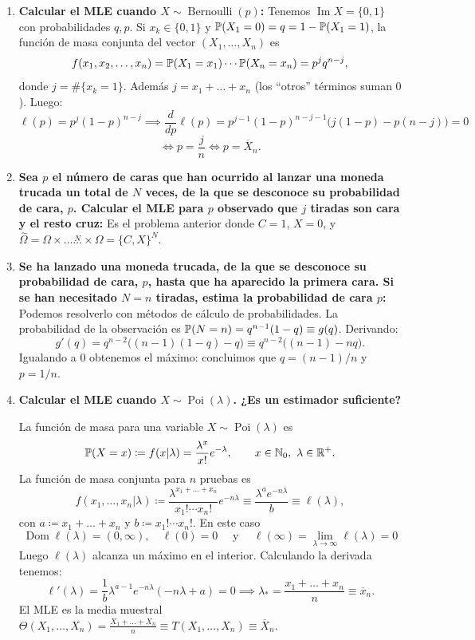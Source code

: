 \begin{enumerate}
  \item \textbf{Calcular el MLE cuando $X \sim \operatorname{Bernoulli}(p)$:}
  Tenemos $\operatorname{Im} X = \{0, 1\}$ con probabilidades $q, p$. Si $x_k \in \{0, 1\}$ y $\mathbb{P}(X_1 = 0) = q = 1 - \mathbb{P}(X_1 = 1)$, la función de masa conjunta del vector $(X_1, \dots, X_n)$ es
  \[
    f(x_1, x_2, \dots, x_n) = \mathbb{P}(X_1 = x_1)\cdots\mathbb{P}(X_n = x_n) = p^j q^{n-j},
  \]
  donde $j = \#\{x_k = 1\}$. Además $j = x_1 + \dots + x_n$ (los ``otros'' términos suman $0$). Luego:
  \[
    \ell(p) = p^j(1-p)^{n-j} \implies \frac{d}{dp} \ell(p) = p^{j-1}(1-p)^{n-j-1}\bigl(j(1-p) - p(n-j)\bigr) = 0 \]
    \[ \iff p = \frac{j}{n} \iff p = \overline{X}_n.
  \]

  \item \textbf{Sea $p$ el número de caras que han ocurrido al lanzar una moneda trucada un total de $N$ veces, de la que se desconoce su probabilidad de cara, $p$. Calcular el MLE para $p$ observado que $j$ tiradas son cara y el resto cruz:}
  Es el problema anterior donde $C = 1$, $X = 0$, y $\hat{\Omega} = \Omega \times \dots \stackrel{N}{\dots} \times \Omega = \{C, X\}^N$. %

  \item \textbf{Se ha lanzado una moneda trucada, de la que se desconoce su probabilidad de cara, $p$, hasta que ha aparecido la primera cara. Si se han necesitado $N = n$ tiradas, estima la probabilidad de cara $p$:}
  Podemos resolverlo con métodos de cálculo de probabilidades. La probabilidad de la observación es $\mathbb{P}(N = n) = q^{n-1}(1-q) \equiv g(q)$. Derivando:
  \[
    g'(q) = q^{n-2}\bigl((n-1)(1-q) - q\bigr) \equiv q^{n-2}\bigl((n-1) - nq\bigr).
  \]
  Igualando a $0$ obtenemos el máximo: concluimos que $q = (n-1)/n$ y $p = 1/n$.

  \item \textbf{Calcular el MLE cuando $X \sim \operatorname{Poi}(\lambda)$. ¿Es un estimador suficiente?}
  
  La función de masa para una variable $X \sim \operatorname{Poi}(\lambda)$ es
  \[
    \mathbb{P}(X = x) \coloneqq f(x|\lambda) = \frac{\lambda^x}{x!}e^{-\lambda}, \qquad x \in \mathbb{N}_0, \ \lambda \in \mathbb{R}^+.
  \]
  La función de masa conjunta para $n$ pruebas es
  \[
    f(x_1, \dots, x_n|\lambda) \coloneqq \frac{\lambda^{x_1 + \dots + x_n}}{x_1!\cdots x_n!}e^{-n\lambda} \equiv \frac{\lambda^a e^{-n\lambda}}{b} \equiv \ell(\lambda),
  \]
  con $a \coloneqq x_1 + \dots + x_n$ y $b \coloneqq x_1!\cdots x_n!$. En este caso $$\operatorname{Dom} \ell(\lambda) = (0, \infty), \quad \ell(0) = 0 \quad \text{ y }  \quad \ell(\infty) = \lim_{\lambda\to\infty} \ell(\lambda) = 0$$ 
  Luego $\ell(\lambda)$ alcanza un máximo en el interior. Calculando la derivada tenemos:
  \[
    \ell'(\lambda) = \frac{1}{b}\lambda^{a-1}e^{-n\lambda}(-n\lambda + a) = 0 \implies \lambda_* = \frac{x_1 + \dots + x_n}{n} \equiv \overline{x}_n.
  \]
  El MLE es la media muestral $\Theta(X_1, \dots, X_n) = \frac{X_1 + \dots + X_n}{n} \equiv T(X_1, \dots, X_n) \equiv \overline{X}_n$.


\end{enumerate}
